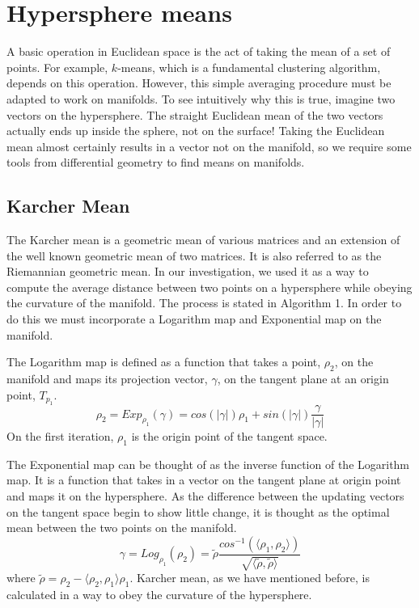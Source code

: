 \documentclass[../tech_report_1.tex]{subfiles}
\begin{document}
\section{Hypersphere means}

A basic operation in Euclidean space is the act of taking the mean of a set of points. For example, $k$-means, which is a fundamental clustering algorithm, depends on this operation. However, this simple averaging procedure must be adapted to work on manifolds. To see intuitively why this is true, imagine two vectors on the hypersphere. The straight Euclidean mean of the two vectors actually ends up inside the sphere, not on the surface! Taking the Euclidean mean almost certainly results in a vector not on the manifold, so we require some tools from differential geometry to find means on manifolds.

\subsection{Karcher Mean}

The Karcher mean is a geometric mean of various matrices and an extension
of the well known geometric mean of two matrices. It is also referred
to as the Riemannian geometric mean. In our investigation, we used
it as a way to compute the average distance between two points on
a hypersphere while obeying the curvature of the manifold. The process
is stated in Algorithm 1. In order to do this we must incorporate a
Logarithm map and Exponential map on the manifold. 


The Logarithm map is defined as a function that takes a point, $\rho_{2}$,
on the manifold and maps its projection vector, $\gamma$, on the
tangent plane at an origin point, $T_{p_{1}}$. 
\begin{equation}
\rho_{2}=Exp_{\rho_{1}}(\gamma)=cos(|\gamma|)\rho_{1}+sin(|\gamma|)\frac{\gamma}{|\gamma|}\label{eq:1}
\end{equation}
On the first iteration, $\rho_{1}$ is the origin point of the tangent
space.

The Exponential map can be thought of as the inverse function of the
Logarithm map. It is a function that takes in a vector on the tangent
plane at origin point and maps it on the hypersphere. As the difference
between the updating vectors on the tangent space begin to show little
change, it is thought as the optimal mean between the two points on
the manifold.
\begin{equation}
\gamma=Log_{\rho_{1}}(\rho_{2})=\tilde{\rho}\frac{cos^{-1}(\langle\rho_{1},\rho_{2}\rangle)}{\sqrt{\langle\tilde{\rho},\tilde{\rho}\rangle}}\label{eq:2}
\end{equation}
where $\tilde{\rho}=\rho_{2}-\langle\rho_{2},\rho_{1}\rangle\rho_{1}$.
Karcher mean, as we have mentioned before, is calculated in a way
to obey the curvature of the hypersphere.
\end{document}
